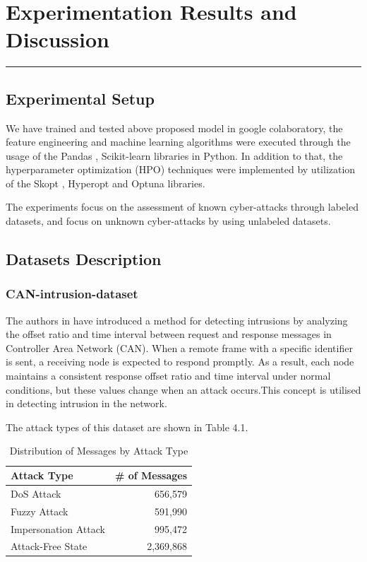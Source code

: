 \chapter{Experimentation Results and Discussion}


\hrule
\vspace{.5cm}
\section{Experimental Setup}
We have trained and tested above proposed model in google colaboratory, the feature engineering and machine learning algorithms were executed through the usage of the Pandas \cite{team2020pandas}, Scikit-learn libraries in Python. In addition to that, the hyperparameter optimization (HPO) techniques were implemented by utilization of the Skopt \cite{head2018scikit}, Hyperopt \cite{komer2014hyperopt} and Optuna libraries.

\par The experiments focus on the assessment of known cyber-attacks through labeled datasets, and focus on unknown cyber-attacks by using unlabeled datasets.

\pagebreak
\section{Datasets Description}
\subsection{CAN-intrusion-dataset}
The authors in \cite{seo2018gids} have introduced a method for detecting intrusions by analyzing the offset ratio and time interval between request and response messages in Controller Area Network (CAN). When a remote frame with a specific identifier is sent, a receiving node is expected to respond promptly. As a result, each node maintains a consistent response offset ratio and time interval under normal conditions, but these values change when an attack occurs.This concept is utilised in detecting intrusion in the network.

The attack types of this dataset are shown in Table 4.1.

\begin{table}[htbp]
\centering
\begin{tabular}{|l|r|}
\hline
\textbf{Attack Type} & \textbf{\# of Messages} \\ \hline
DoS Attack & 656,579 \\ \hline
Fuzzy Attack & 591,990 \\ \hline
Impersonation Attack & 995,472 \\ \hline
Attack-Free State & 2,369,868 \\ \hline
\end{tabular}
\caption{Distribution of Messages by Attack Type}
\label{tab:attack_messages}
\end{table}

